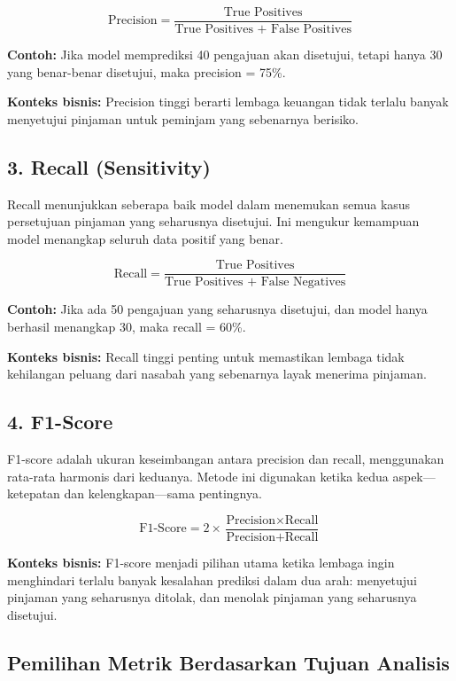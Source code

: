 \[
\text{Precision} = \frac{\text{True Positives}}{\text{True Positives + False Positives}}
\]

\textbf{Contoh:} Jika model memprediksi 40 pengajuan akan disetujui, tetapi hanya 30 yang benar-benar disetujui, maka precision = 75\%.

\textbf{Konteks bisnis:} Precision tinggi berarti lembaga keuangan tidak terlalu banyak menyetujui pinjaman untuk peminjam yang sebenarnya berisiko.

\subsection*{3. Recall (Sensitivity)}

Recall menunjukkan seberapa baik model dalam menemukan semua kasus persetujuan pinjaman yang seharusnya disetujui. Ini mengukur kemampuan model menangkap seluruh data positif yang benar.

\[
\text{Recall} = \frac{\text{True Positives}}{\text{True Positives + False Negatives}}
\]

\textbf{Contoh:} Jika ada 50 pengajuan yang seharusnya disetujui, dan model hanya berhasil menangkap 30, maka recall = 60\%.

\textbf{Konteks bisnis:} Recall tinggi penting untuk memastikan lembaga tidak kehilangan peluang dari nasabah yang sebenarnya layak menerima pinjaman.

\subsection*{4. F1-Score}

F1-score adalah ukuran keseimbangan antara precision dan recall, menggunakan rata-rata harmonis dari keduanya. Metode ini digunakan ketika kedua aspek—ketepatan dan kelengkapan—sama pentingnya.

\[
\text{F1-Score} = 2 \times \frac{\text{Precision} \times \text{Recall}}{\text{Precision} + \text{Recall}}
\]

\textbf{Konteks bisnis:} F1-score menjadi pilihan utama ketika lembaga ingin menghindari terlalu banyak kesalahan prediksi dalam dua arah: menyetujui pinjaman yang seharusnya ditolak, dan menolak pinjaman yang seharusnya disetujui.

\subsection*{Pemilihan Metrik Berdasarkan Tujuan Analisis}

